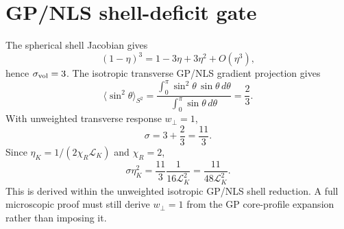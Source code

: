 \section{GP/NLS shell-deficit gate}
The spherical shell Jacobian gives
\[
  (1-\eta)^3=1-3\eta+3\eta^2+O(\eta^3),
\]
hence \(\sigma_{\rm vol}=3\). The isotropic transverse GP/NLS gradient
projection gives
\[
  \langle \sin^2\theta\rangle_{S^2}
  =
  \frac{\int_0^\pi \sin^2\theta\,\sin\theta\,d\theta}
       {\int_0^\pi \sin\theta\,d\theta}
  =
  \frac23.
\]
With unweighted transverse response \(w_\perp=1\),
\[
  \sigma=3+\frac23=\frac{11}{3}.
\]
Since \(\eta_K=1/(2\chi_R\mathcal L_K)\) and \(\chi_R=2\),
\[
  \sigma\eta_K^2
  =
  \frac{11}{3}\frac{1}{16\mathcal L_K^2}
  =
  \frac{11}{48\mathcal L_K^2}.
\]
This is derived within the unweighted isotropic GP/NLS shell reduction. A full
microscopic proof must still derive \(w_\perp=1\) from the GP core-profile
expansion rather than imposing it.
